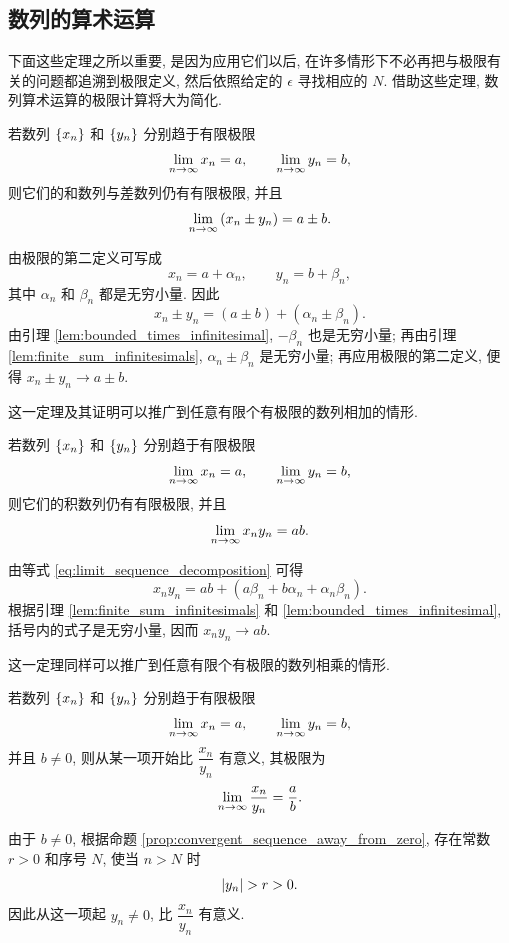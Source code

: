 \subsection{数列的算术运算}\label{subsec:30}
下面这些定理之所以重要, 是因为应用它们以后, 在许多情形下不必再把与极限有关的问题都追溯到极限定义,
然后依照给定的 $\epsilon$ 寻找相应的 $N$.
借助这些定理, 数列算术运算的极限计算将大为简化.

\myrefparagraph{1\textdegree}\label{prop:limit_sum_difference}
{\kaishu 若数列 $\{x_{n}\}$ 和 $\{y_{n}\}$ 分别趋于有限极限
$$
\lim\limits_{n \to \infty}x_n=a,\qquad \lim\limits_{n \to \infty}y_n=b,
$$
则它们的和数列与差数列仍有有限极限, 并且
$$
\lim\limits_{n \to \infty}\left( x_n\pm y_n \right)=a\pm b.
$$}

由极限的第二定义可写成
\begin{equation}\label{eq:limit_sequence_decomposition}
x_n=a+\alpha_n,\qquad y_n=b+\beta_n,
\end{equation}
其中 $\alpha_n$ 和 $\beta_n$ 都是无穷小量. 因此
$$
x_n\pm y_n=(a\pm b)+(\alpha_n\pm\beta_n).
$$
由引理 \ref{lem:bounded_times_infinitesimal}, $-\beta_n$ 也是无穷小量;
再由引理 \ref{lem:finite_sum_infinitesimals}, $\alpha_n\pm\beta_n$ 是无穷小量;
再应用极限的第二定义, 便得 $x_n\pm y_n\to a\pm b$.

这一定理及其证明可以推广到任意有限个有极限的数列相加的情形.

\myrefparagraph{2\textdegree}\label{prop:limit_product}
{\kaishu 若数列 $\{x_{n}\}$ 和 $\{y_{n}\}$ 分别趋于有限极限
$$
\lim\limits_{n \to \infty}x_n=a,\qquad \lim\limits_{n \to \infty}y_n=b,
$$
则它们的积数列仍有有限极限, 并且
$$
\lim\limits_{n \to \infty}x_ny_n=ab.
$$}

由等式 \eqref{eq:limit_sequence_decomposition} 可得
$$
x_ny_n=ab+(a\beta_n+b\alpha_n+\alpha_n\beta_n).
$$
根据引理 \ref{lem:finite_sum_infinitesimals} 和 \ref{lem:bounded_times_infinitesimal},
括号内的式子是无穷小量, 因而 $x_ny_n\to ab$.

这一定理同样可以推广到任意有限个有极限的数列相乘的情形.

\myrefparagraph{3\textdegree}\label{prop:limit_quotient}
{\kaishu 若数列 $\{x_{n}\}$ 和 $\{y_{n}\}$ 分别趋于有限极限
$$
\lim\limits_{n \to \infty}x_n=a,\qquad \lim\limits_{n \to \infty}y_n=b,
$$
并且 $b\neq0$, 则从某一项开始比 $\dfrac{x_n}{y_n}$ 有意义, 其极限为
$$
\lim\limits_{n \to \infty}\frac{x_n}{y_n}=\frac{a}{b}.
$$}

由于 $b\neq0$, 根据命题 \ref{prop:convergent_sequence_away_from_zero},
存在常数 $r>0$ 和序号 $N$, 使当 $n>N$ 时
$$
\abs{y_n}>r>0.
$$
因此从这一项起 $y_n\neq0$, 比 $\dfrac{x_n}{y_n}$ 有意义.

